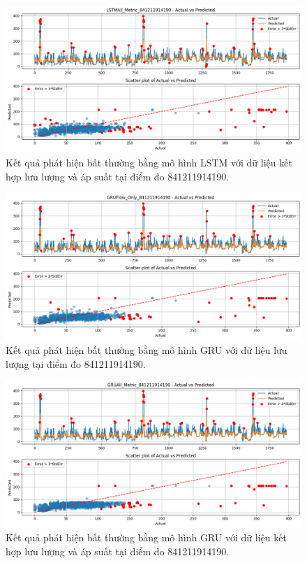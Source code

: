 \begin{figure}[htbp]
    \centering
    \includegraphics[width=\textwidth]{image/section6_3/anomaly_detection_841211914190_lstm_allmetric.png}
    \caption{Kết quả phát hiện bất thường bằng mô hình LSTM với dữ liệu kết hợp lưu lượng và áp suất tại điểm đo 841211914190.}
    \label{fig:anomaly_lstm_841211914190_all}
\end{figure}

\begin{figure}[htbp]
    \centering
    \includegraphics[width=\textwidth]{image/section6_3/anomaly_detection_841211914190_gru_flow.png}
    \caption{Kết quả phát hiện bất thường bằng mô hình GRU với dữ liệu lưu lượng tại điểm đo 841211914190.}
    \label{fig:anomaly_gru_841211914190_flow}
\end{figure}

\begin{figure}[htbp]
    \centering
    \includegraphics[width=\textwidth]{image/section6_3/anomaly_detection_841211914190_gru_allmetric.png}
    \caption{Kết quả phát hiện bất thường bằng mô hình GRU với dữ liệu kết hợp lưu lượng và áp suất tại điểm đo 841211914190.}
    \label{fig:anomaly_gru_841211914190_all}
\end{figure}

